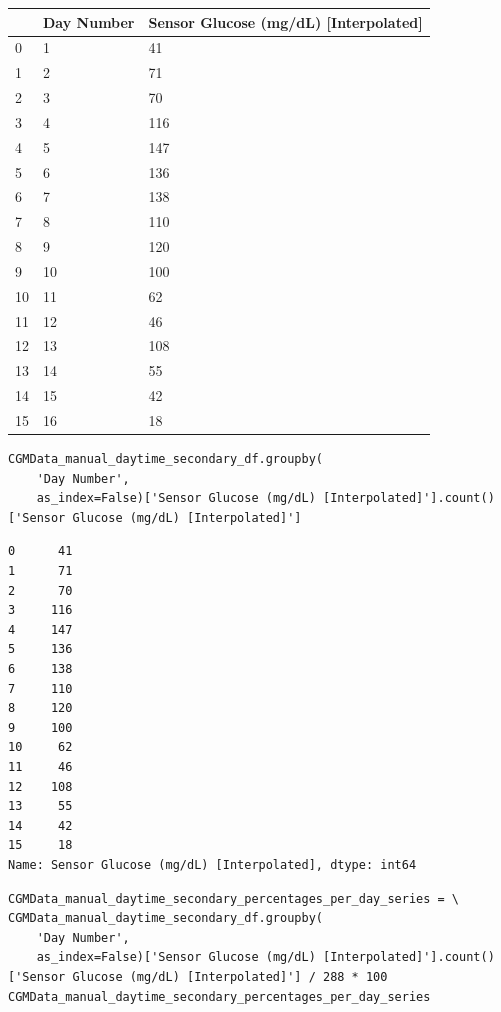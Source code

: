 \bigskip\noindent
\begin{tabular}{p{}p{}p{}}
\toprule
 & Day Number & Sensor Glucose (mg/dL) [Interpolated] \\
\hline
0 & 1 & 41 \\
\hline
1 & 2 & 71 \\
\hline
2 & 3 & 70 \\
\hline
3 & 4 & 116 \\
\hline
4 & 5 & 147 \\
\hline
5 & 6 & 136 \\
\hline
6 & 7 & 138 \\
\hline
7 & 8 & 110 \\
\hline
8 & 9 & 120 \\
\hline
9 & 10 & 100 \\
\hline
10 & 11 & 62 \\
\hline
11 & 12 & 46 \\
\hline
12 & 13 & 108 \\
\hline
13 & 14 & 55 \\
\hline
14 & 15 & 42 \\
\hline
15 & 16 & 18 \\
\hline
\bottomrule
\end{tabular}

\bigskip

\begin{verbatim}
CGMData_manual_daytime_secondary_df.groupby(
    'Day Number', 
    as_index=False)['Sensor Glucose (mg/dL) [Interpolated]'].count()['Sensor Glucose (mg/dL) [Interpolated]']
\end{verbatim}

\begin{verbatim}
0      41
1      71
2      70
3     116
4     147
5     136
6     138
7     110
8     120
9     100
10     62
11     46
12    108
13     55
14     42
15     18
Name: Sensor Glucose (mg/dL) [Interpolated], dtype: int64
\end{verbatim}

\begin{verbatim}
CGMData_manual_daytime_secondary_percentages_per_day_series = \
CGMData_manual_daytime_secondary_df.groupby(
    'Day Number', 
    as_index=False)['Sensor Glucose (mg/dL) [Interpolated]'].count()['Sensor Glucose (mg/dL) [Interpolated]'] / 288 * 100
CGMData_manual_daytime_secondary_percentages_per_day_series
\end{verbatim}

